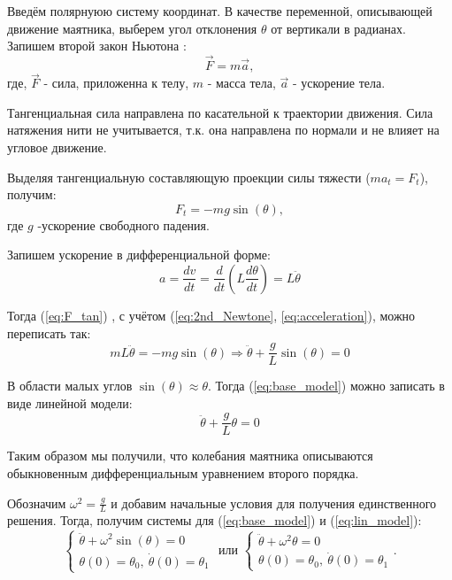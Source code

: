 Введём полярнуюю систему координат. В качестве переменной, описывающей движение маятника, выберем угол отклонения $\theta$ от вертикали в радианах. Запишем второй закон Ньютона \cite{feinman}:
\begin{equation}
	\overrightarrow{F} = m \overrightarrow{a},
	\label{eq:2nd_Newtone}
\end{equation}
где, $\overrightarrow{F}$ - сила, приложенна к телу, $m$ - масса тела, $\overrightarrow{a}$ - ускорение тела.

Тангенциальная сила направлена по касательной к траектории движения. Сила натяжения нити не учитывается, т.к. она направлена по нормали  и не влияет на угловое движение.

Выделяя тангенциальную составляющую \cite{feinman} проекции силы тяжести ($ma_t = F_t$), получим:
\begin{equation}
	F_t = - mg\sin(\theta),
	\label{eq:F_tan}
\end{equation}
где $g$ -ускорение свободного падения.

Запишем ускорение в дифференциальной форме:
\begin{equation}
	a = \frac{dv}{dt} = \frac{d}{dt}\left(L\frac{d\theta}{dt}\right) = L \ddot{\theta}
	\label{eq:acceleration}
\end{equation}

Тогда (\ref{eq:F_tan}) , с учётом (\ref{eq:2nd_Newtone}, \ref{eq:acceleration}), можно переписать так:
\begin{equation}
	mL\ddot{\theta} = -mg\sin(\theta) \Rightarrow \ddot{\theta} +\frac{g}{L}\sin(\theta) = 0 
	\label{eq:base_model}
\end{equation}

В области малых углов $\sin(\theta) \approx \theta$.
Тогда (\ref{eq:base_model}) можно записать в виде линейной модели:
\begin{equation}
	\ddot{\theta} +\frac{g}{L}\theta = 0
	\label{eq:lin_model}
\end{equation}

Таким образом мы получили, что колебания маятника описываются обыкновенным дифференциальным уравнением второго порядка. 

Обозначим $\omega^2 = \frac{g}{L}$ и добавим начальные условия для получения единственного решения. Тогда, получим системы для (\ref{eq:base_model}) и (\ref{eq:lin_model}):
\begin{equation}
	\begin{cases}
		\ddot{\theta} + \omega^2 \sin(\theta) = 0 \\
		\theta(0) = \theta_0, \ \dot{\theta}(0) = \theta_1
	\end{cases}
	\text{ или }
	\begin{cases}
		\ddot{\theta} + \omega^2 \theta = 0 \\
		\theta(0) = \theta_0, \ \dot{\theta}(0) = \theta_1
	\end{cases}.
\end{equation}

